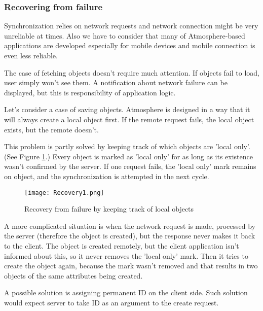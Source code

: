 \subsubsection{Recovering from failure}
\label{sec:failure_recovery}

Synchronization relies on network requests and network connection might be very unreliable at times. Also we have to consider that many of Atmosphere-based applications are developed especially for mobile devices and mobile connection is even less reliable.

The case of fetching objects doesn't require much attention. If objects fail to load, user simply won't see them. A notification about network failure can be displayed, but this is responsibility of application logic.

Let's consider a case of saving objects. Atmosphere is designed in a way that it will always create a local object first. If the remote request fails, the local object exists, but the remote doesn't.

This problem is partly solved by keeping track of which objects are 'local only'. (See Figure \ref{fig:recovery1}.) Every object is marked as 'local only' for as long as its existence wasn't confirmed by the server.  If one request fails,  the 'local only' mark remains on object,  and the synchronization is attempted in the next cycle. 

\begin{figure}[htbp]
  \centering
    \texttt{[image: Recovery1.png]}
  \caption{Recovery from failure by keeping track of local objects}
  \label{fig:recovery1}
\end{figure}

A more complicated situation is when the network request is made, processed by the server (therefore the object is created), but the response never makes it back to the client. The object is created remotely, but the client application isn’t informed about this, so it never removes the 'local only' mark. Then it tries to create the object again, because the mark wasn't removed and that results in two objects of the same attributes being created.

A possible solution is assigning permanent ID on the client side. Such solution would expect server to take ID as an argument to the create request.

